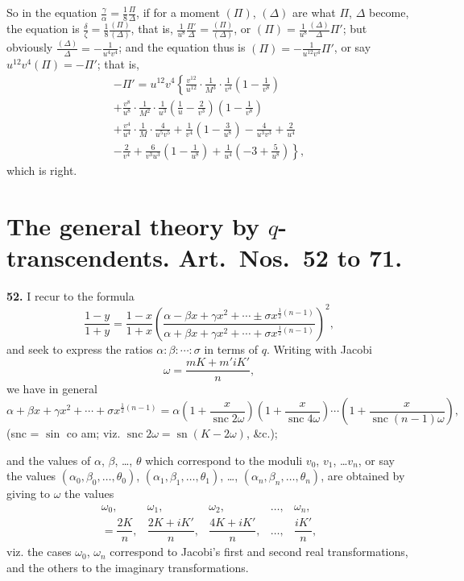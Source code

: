 \documentclass[12pt,a4paper]{article}
\DeclareMathOperator{\sn}{sn}
\DeclareMathOperator{\snc}{snc}
\begin{document}
So in the equation $\frac{\gamma}{\alpha} = \frac{1}{8}\frac{\Pi}{\Delta}$, if for a moment $(\Pi)$, $(\Delta)$ are what $\Pi$, $\Delta$ become, the equation is $\frac{\delta}{\zeta} = \frac{1}{8}\frac{(\Pi)}{(\Delta)}$, that is, $\frac{1}{u^8}\frac{\Pi'}{\Delta} = \frac{(\Pi)}{(\Delta)}$, or $(\Pi) = \frac{1}{u^8}\frac{(\Delta)}{\Delta}\Pi'$; but obviously $\frac{(\Delta)}{\Delta} = -\frac{1}{u^4 v^4}$; and the equation thus is $(\Pi) = -\frac{1}{u^{12}v^4}\Pi'$, or say $u^{12}v^4(\Pi) = -\Pi'$; that is,
\begin{multline*}
-\Pi' = u^{12}v^4\left\{
\frac{v^{12}}{u^{12}} \cdot \frac{1}{M^3} \cdot \frac{1}{v^4}\left(1 - \frac{1}{v^8}\right)\right. \\
+ \frac{v^8}{u^8} \cdot \frac{1}{M^2} \cdot \frac{1}{u^3}\left(\frac{1}{u} - \frac{2}{v^3}\right)\left(1 - \frac{1}{v^8}\right) \\
+ \frac{v^4}{u^4} \cdot \frac{1}{M} \cdot \frac{4}{u^5 v^5} + \frac{1}{v^4}\left(1 - \frac{3}{u^8}\right) - \frac{4}{u^3 v^3} + \frac{2}{u^4} \\
\left. - \frac{2}{v^4} + \frac{6}{v^3 u^3}\left(1 - \frac{1}{u^8}\right) + \frac{1}{u^4}\left(-3 + \frac{5}{u^8}\right)\right\},
\end{multline*}
which is right.




\section*{The general theory by $q$-transcendents. Art.~Nos.~52 to 71.}

\textbf{52.} I recur to the formula
\[
\frac{1 - y}{1 + y} = \frac{1 - x}{1 + x}
\left(\frac{\alpha - \beta x + \gamma x^2 + \cdots \pm \sigma x^{\frac{1}{2}(n-1)}}
{\alpha + \beta x + \gamma x^2 + \cdots + \sigma x^{\frac{1}{2}(n-1)}}\right)^2,
\]
and seek to express the ratios $\alpha : \beta : \cdots : \sigma$ in terms of $q$. Writing with Jacobi
\[
\omega = \frac{mK + m'iK'}{n},
\]
we have in general
\[
\alpha + \beta x + \gamma x^2 + \cdots + \sigma x^{\frac{1}{2}(n-1)}
= \alpha\left(1 + \frac{x}{\snc 2\omega}\right)
\left(1 + \frac{x}{\snc 4\omega}\right) \cdots
\left(1 + \frac{x}{\snc (n-1)\omega}\right),
\]
(snc = $\sin$ co am; viz. $\snc 2\omega = \sn(K - 2\omega)$, \&c.);

and the values of $\alpha$, $\beta$, \ldots, $\theta$ which correspond to the moduli $v_0$, $v_1$, \ldots $v_n$, or say the values $(\alpha_0, \beta_0, \ldots, \theta_0)$, $(\alpha_1, \beta_1, \ldots, \theta_1)$, \ldots, $(\alpha_n, \beta_n, \ldots, \theta_n)$, are obtained by giving to $\omega$ the values
\[
\begin{array}{ccccc}
\omega_0, & \omega_1, & \omega_2, & \ldots, & \omega_n, \\
= \dfrac{2K}{n}, & \dfrac{2K + iK'}{n}, & \dfrac{4K + iK'}{n}, & \ldots, & \dfrac{iK'}{n},
\end{array}
\]
viz. the cases $\omega_0$, $\omega_n$ correspond to Jacobi's first and second real transformations, and the others to the imaginary transformations.
\end{document}
